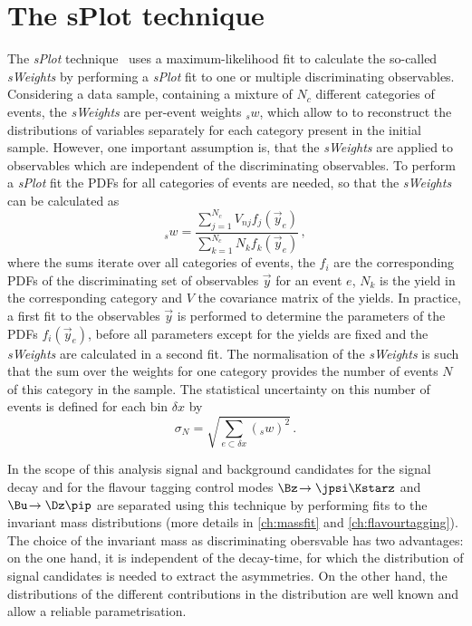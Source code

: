 \section{The sPlot technique}
\label{sec:splot}

The \emph{sPlot} technique~\cite{Pivk:2004ty} uses a maximum-likelihood fit to calculate the so-called \emph{sWeights} by performing a \emph{sPlot} fit to one or multiple discriminating observables.
Considering a data sample, containing a mixture of $N_c$ different categories of events, the \emph{sWeights} are per-event weights ${}_sw$, which allow to to reconstruct the distributions of variables separately for each category present in the initial sample.
However, one important assumption is, that the \emph{sWeights} are applied to observables which are independent of the discriminating observables.
To perform a \emph{sPlot} fit the PDFs for all categories of events are needed, so that the \emph{sWeights} can be calculated as
\begin{equation}
{}_sw=\frac{\sum_{j=1}^{N_c}V_{nj}f_j(\vec{y}_e)}{\sum_{k=1}^{N_c}N_kf_k(\vec{y}_e)}\,,
\end{equation}
where the sums iterate over all categories of events, the $f_i$ are the corresponding PDFs of the discriminating set of observables $\vec{y}$ for an event $e$, $N_k$ is the yield in the corresponding category and $V$ the covariance matrix of the yields.
In practice, a first fit to the observables $\vec{y}$ is performed to determine the parameters of the PDFs $f_i(\vec{y}_e)$, before all parameters except for the yields are fixed and the \emph{sWeights} are calculated in a second fit.
The normalisation of the \emph{sWeights} is such that the sum over the weights for one category provides the number of events $N$ of this category in the sample.
The statistical uncertainty on this number of events is defined for each bin $\delta x$ by
\begin{equation}
\sigma_N=\sqrt{\sum_{e\subset\delta x}({}_sw)^2}\,.
\end{equation}

In the scope of this analysis signal and background candidates for the signal decay \mbox{\BdToDpi} and for the flavour tagging control modes $\Bz\!\to\jpsi\Kstarz$ and $\Bu\!\to\Dz\pip$ are separated using this technique by performing fits to the invariant mass distributions (more details in \cref{ch:massfit} and \cref{ch:flavourtagging}).
The choice of the invariant mass as discriminating obersvable has two advantages:
on the one hand, it is independent of the decay-time, for which the distribution of signal candidates is needed to \eg extract the \CP asymmetries.
On the other hand, the distributions of the different contributions in the distribution are well known and allow a reliable parametrisation.
